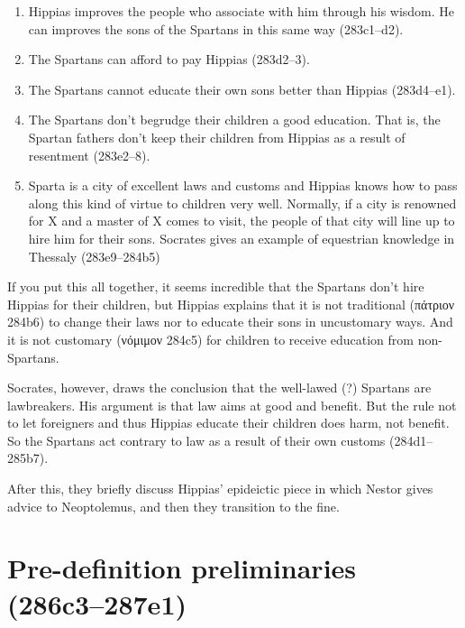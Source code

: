\documentclass[11pt]{article}
\begin{document}
\begin{enumerate}
    \item Hippias improves the people who associate with him through his wisdom.  He can improves the sons of the Spartans in this same way (283c1--d2).
    \item The Spartans can afford to pay Hippias (283d2--3).
    \item The Spartans cannot educate their own sons better than Hippias (283d4--e1).
    \item The Spartans don't begrudge their children a good education.  That is, the Spartan fathers don't keep their children from Hippias as a result of resentment (283e2--8).
    \item Sparta is a city of excellent laws and customs and Hippias knows how to pass along this kind of virtue to children very well.  Normally, if a city is renowned for X and a master of X comes to visit, the people of that city will line up to hire him for their sons.  Socrates gives an example of equestrian knowledge in Thessaly (283e9--284b5)
\end{enumerate}

If you put this all together, it seems incredible that the Spartans don't hire Hippias for their children, but Hippias explains that it is not traditional (πάτριον 284b6) to change their laws nor to educate their sons in uncustomary ways. And it is not customary (νόμιμον 284c5) for children to receive education from non-Spartans.

Socrates, however, draws the conclusion that the well-lawed (?) Spartans are lawbreakers.  His argument is that law aims at good and benefit.  But the rule not to let foreigners and thus Hippias educate their children does harm, not benefit.  So the Spartans act contrary to law as a result of their own customs (284d1--285b7).

After this, they briefly discuss Hippias' epideictic piece in which Nestor gives advice to Neoptolemus, and then they transition to the fine.


\section{Pre-definition preliminaries (286c3--287e1)}


\end{document}
